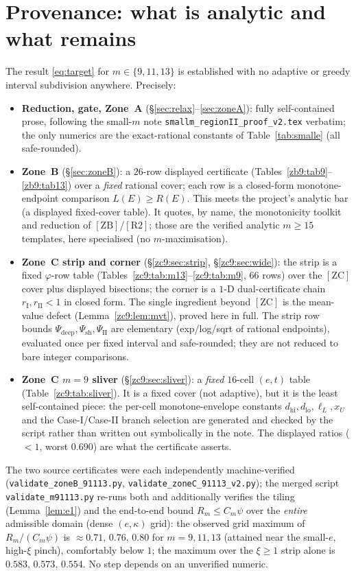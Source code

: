 \documentclass[11pt]{amsart}
\newcommand{\RII}{[\textrm{R2}]}
\newcommand{\ZB}{[\textrm{ZB}]}
\newcommand{\ZC}{[\textrm{ZC}]}
\begin{document}
\section{Provenance: what is analytic and what remains}\label{sec:prov}

The result \eqref{eq:target} for $m\in\{9,11,13\}$ is established with no adaptive
or greedy interval subdivision anywhere.  Precisely:
\begin{itemize}
\item \textbf{Reduction, gate, Zone~A} (\S\ref{sec:relax}--\ref{sec:zoneA}):
 fully self-contained prose, following the small-$m$ note
 \texttt{smallm\_regionII\_proof\_v2.tex} verbatim; the only numerics are the
 exact-rational constants of Table~\ref{tab:smalle} (all safe-rounded).
\item \textbf{Zone~B} (\S\ref{sec:zoneB}): a $26$-row displayed certificate
 (Tables~\ref{zb9:tab9}--\ref{zb9:tab13}) over a \emph{fixed} rational cover;
 each row is a closed-form monotone-endpoint comparison $L(E)\ge R(E)$.  This
 meets the project's analytic bar (a displayed fixed-cover table).  It quotes,
 by name, the monotonicity toolkit and reduction of $\ZB$/$\RII$; those are the
 verified analytic $m\ge15$ templates, here specialised (no $m$-maximisation).
\item \textbf{Zone~C strip and corner} (\S\ref{zc9:sec:strip},
 \S\ref{zc9:sec:wide}): the strip is a fixed $\varphi$-row table
 (Tables~\ref{zc9:tab:m13}--\ref{zc9:tab:m9}, $66$ rows) over the $\ZC$ cover
 plus displayed bisections; the corner is a $1$-D dual-certificate chain
 $r_{\mathrm I},r_{\mathrm{II}}<1$ in closed form.  The single ingredient beyond
 $\ZC$ is the mean-value defect (Lemma~\ref{zc9:lem:mvt}), proved here in full.
 The strip row bounds $\Psi_{\mathrm{deep}},\Psi_{\mathrm{sh}},\Psi_{\mathrm{II}}$
 are elementary (exp/log/sqrt of rational endpoints), evaluated once per fixed
 interval and safe-rounded; they are not reduced to bare integer comparisons.
\item \textbf{Zone~C $m=9$ sliver} (\S\ref{zc9:sec:sliver}): a \emph{fixed}
 $16$-cell $(e,t)$ table (Table~\ref{zc9:tab:sliver}).  It is a fixed cover (not
 adaptive), but it is the least self-contained piece: the per-cell
 monotone-envelope constants $d_{\mathrm{hi}},d_{\mathrm{lo}},\ell_L,x_U$ and the
 Case-I/Case-II branch selection are generated and checked by the script rather
 than written out symbolically in the note.  The displayed ratios ($<1$, worst
 $0.690$) are what the certificate asserts.
\end{itemize}
The two source certificates were each independently machine-verified
(\texttt{validate\_zoneB\_91113.py}, \texttt{validate\_zoneC\_91113\_v2.py});
the merged script \texttt{validate\_m91113.py} re-runs both and additionally
verifies the tiling (Lemma~\ref{lem:e1}) and the end-to-end bound
$R_m\le C_m\psi$ over the \emph{entire} admissible domain (dense
$(e,\kappa)$ grid): the observed grid maximum of $R_m/(C_m\psi)$ is
$\approx0.71,\,0.76,\,0.80$ for $m=9,11,13$ (attained near the small-$e$,
high-$\xi$ pinch), comfortably below $1$; the maximum over the $\xi\ge1$
strip alone is $0.583,\,0.573,\,0.554$.  No step depends on an unverified
numeric.
\end{document}
